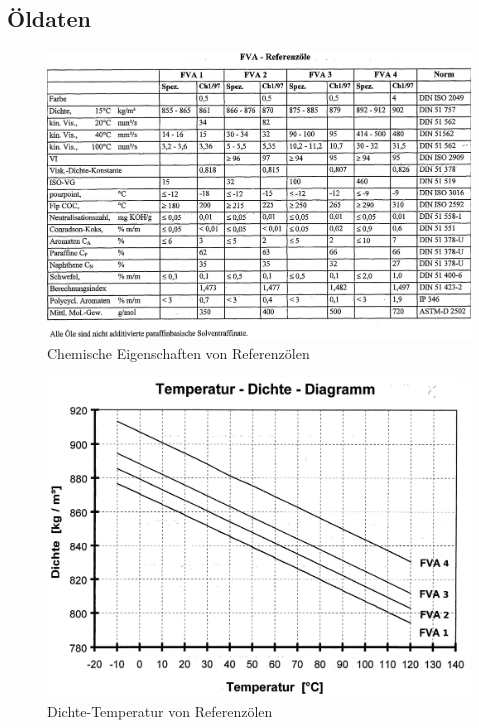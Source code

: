 \begin{appendices}
    \chapter{Öldaten}
        \begin{figure}
            \centering
            \includegraphics[width=\linewidth]{./images/fva_chemische_daten.png}
            \caption{Chemische Eigenschaften von Referenzölen \cite{schilling_1985}}
            \label{fig:fva_chemische_eigenschaften_referenzoelen}
        \end{figure}

        \begin{figure}
            \centering
            \includegraphics[width=\linewidth]{./images/fva_dichte_temperatur.png}
            \caption{Dichte-Temperatur von Referenzölen \cite{schilling_1985}}
            \label{fig:fva_dichte_temperatur}
        \end{figure}


\end{appendices}
